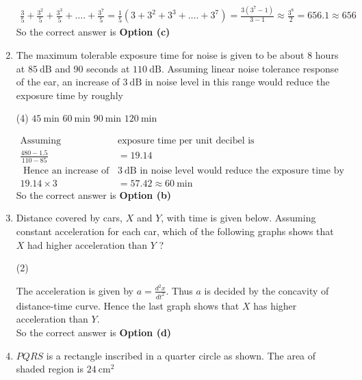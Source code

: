 \begin{enumerate}
\begin{answer}
	\begin{align*}
\frac{3}{5}+\frac{3^{2}}{5}+\frac{3^{3}}{5}+\ldots .+\frac{3^{7}}{5}=\frac{1}{5}\left(3+3^{2}+3^{3}+\ldots .+3^{7}\right)=\frac{3\left(3^{7}-1\right)}{3-1} \approx \frac{3^{8}}{2}=656.1 \approx 656
	\end{align*}
		So the correct answer is \textbf{Option (c)}
\end{answer}
\item The maximum tolerable exposure time for noise is given to be about 8 hours at $85 \mathrm{~dB}$ and 90 seconds at $110 \mathrm{~dB}$. Assuming linear noise tolerance response of the ear, an increase of $3 \mathrm{~dB}$ in noise level in this range would reduce the exposure time by roughly
 \begin{tasks}(4)
	\task[\textbf{a.}]$45 \mathrm{~min}$
	\task[\textbf{b.}]$60 \mathrm{~min}$
	\task[\textbf{c.}]$90 \mathrm{~min}$
	\task[\textbf{d.}]$120 \mathrm{~min}$ 
\end{tasks}
\begin{answer}
	\begin{align*}
	\text{Assuming linearization }&\text{exposure time per unit decibel is}\\
	\frac{480-1.5}{110-85}&=19.14\\
\text{	Hence an increase of }&\text{$3 \mathrm{~dB}$ in noise level would reduce the exposure time by roughly}\\
	19.14 \times 3&=57.42 \approx 60 \mathrm{~min}
	\end{align*}
	So the correct answer is \textbf{Option (b)}
\end{answer}
\item Distance covered by cars, $X$ and $Y$, with time is given below. Assuming constant acceleration for each car, which of the following graphs shows that $X$ had higher acceleration than $Y$ ? \begin{tasks}(2)
	\task[\textbf{a.}]
	\task[\textbf{b.}]
	\task[\textbf{c.}]
	\task[\textbf{d.}] 
\end{tasks}
\begin{answer}
	The acceleration is given by $a=\frac{d^{2} x}{d t^{2}}$. Thus $a$ is decided by the concavity of distance-time curve. Hence the last graph shows that $X$ has higher acceleration than $Y$.\\
		So the correct answer is \textbf{Option (d)}
\end{answer}
\item  $P Q R S$ is a rectangle inscribed in a quarter circle as shown. The area of shaded region is $24 \mathrm{~cm}^{2}$

\end{enumerate}
